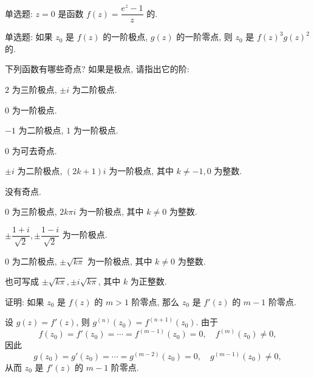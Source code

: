 \begin{exercise}
	单选题: $z=0$ 是函数 $f(z)=\dfrac{e^z-1}{z}$ 的.
\end{exercise}


\begin{exercise}
	单选题: 如果 $z_0$ 是 $f(z)$ 的一阶极点, $g(z)$ 的一阶零点, 则 $z_0$ 是 $f(z)^3g(z)^2$ 的.
\end{exercise}


\begin{exercise}[3]
	下列函数有哪些奇点? 如果是极点, 请指出它的阶:
\end{exercise}
\begin{solution}
	\subex $2$ 为三阶极点, $\pm i$ 为二阶极点.

	\subex $0$ 为一阶极点.

	\subex $-1$ 为二阶极点, $1$ 为一阶极点.

	\subex $0$ 为可去奇点.

	\subex $\pm i$ 为二阶极点, $(2k+1)i$ 为一阶极点, 其中 $k\neq -1,0$ 为整数.

	\subex 没有奇点.

	\subex $0$ 为三阶极点, $2k\pi i$ 为一阶极点, 其中 $k\neq0$ 为整数.

	\subex $\pm\dfrac{1+i}{\sqrt2},\pm\dfrac{1-i}{\sqrt2}$ 为一阶极点.

	\subex $0$ 为二阶极点, $\pm\sqrt{k\pi}$ 为一阶极点, 其中 $k\neq 0$ 为整数.

	也可写成 $\pm\sqrt{k\pi},\pm i\sqrt{k\pi}$, 其中 $k$ 为正整数.
\end{solution}


\begin{exercise}
	证明: 如果 $z_0$ 是 $f(z)$ 的 $m>1$ 阶零点, 那么 $z_0$ 是 $f'(z)$ 的 $m-1$ 阶零点.
\end{exercise}
\begin{solution}[证明]
	设 $g(z)=f'(z)$, 则 $g^{(n)}(z_0)=f^{(n+1)}(z_0)$.
	由于
	\[f(z_0)=f'(z_0)=\cdots=f^{(m-1)}(z_0)=0,\quad f^{(m)}(z_0)\neq 0,\]
	因此
	\[g(z_0)=g'(z_0)=\cdots=g^{(m-2)}(z_0)=0,\quad g^{(m-1)}(z_0)\neq 0,\]
	从而 $z_0$ 是 $f'(z)$ 的 $m-1$ 阶零点.
\end{solution}


